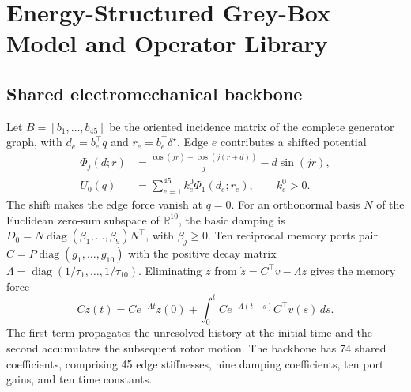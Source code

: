 \documentclass[journal]{IEEEtran}
\DeclareMathOperator{\diag}{diag}
\begin{document}
\section{Energy-Structured Grey-Box Model and Operator Library}
\label{sec:model}
\subsection{Shared electromechanical backbone}
Let \(B=[b_1,\ldots,b_{45}]\) be the oriented incidence matrix of the
complete generator graph, with \(d_e=b_e^\top q\) and
\(r_e=b_e^\top\delta^\star\). Edge \(e\) contributes a shifted potential
\begin{align}
 \Phi_j(d;r)&=\frac{\cos(jr)-\cos(j(r+d))}{j}
                  -d\sin(jr),\\
 U_0(q)&=\sum_{e=1}^{45} k_e^0\Phi_1(d_e;r_e),
 \qquad k_e^0>0.
 \label{eq:basic_potential}
\end{align}
The shift makes the edge force vanish at \(q=0\). For an orthonormal basis
\(N\) of the Euclidean zero-sum subspace of \(\mathbb R^{10}\), the basic
damping is \(D_0=N\diag(\beta_1,\ldots,\beta_9)N^\top\), with
\(\beta_j\ge 0\). Ten reciprocal memory ports pair
\(C=P\diag(g_1,\ldots,g_{10})\) with the positive decay matrix
\(\Lambda=\diag(1/\tau_1,\ldots,1/\tau_{10})\).
Eliminating \(z\) from \(\dot z=C^\top v-\Lambda z\) gives the memory force
\begin{equation}
 Cz(t)=Ce^{-\Lambda t}z(0)+
    \int_0^t Ce^{-\Lambda(t-s)}C^\top v(s)\,ds.
 \label{eq:memory_kernel}
\end{equation}
The first term propagates the unresolved history at the initial time and the
second accumulates the subsequent rotor motion. The backbone has 74 shared
coefficients, comprising 45 edge stiffnesses, nine damping coefficients, ten
port gains, and ten time constants.
\end{document}

